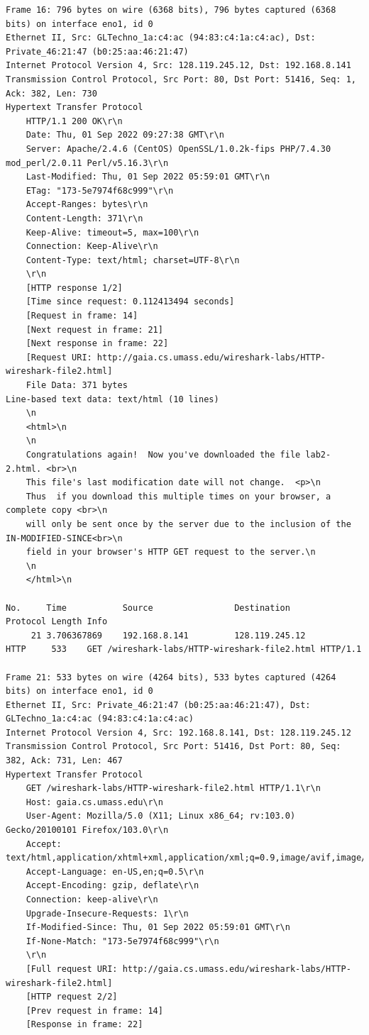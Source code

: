 \documentclass[a4paper,11pt,final]{report}
\begin{document}
\begin{lstlisting}[breaklines]
Frame 16: 796 bytes on wire (6368 bits), 796 bytes captured (6368 bits) on interface eno1, id 0
Ethernet II, Src: GLTechno_1a:c4:ac (94:83:c4:1a:c4:ac), Dst: Private_46:21:47 (b0:25:aa:46:21:47)
Internet Protocol Version 4, Src: 128.119.245.12, Dst: 192.168.8.141
Transmission Control Protocol, Src Port: 80, Dst Port: 51416, Seq: 1, Ack: 382, Len: 730
Hypertext Transfer Protocol
    HTTP/1.1 200 OK\r\n
    Date: Thu, 01 Sep 2022 09:27:38 GMT\r\n
    Server: Apache/2.4.6 (CentOS) OpenSSL/1.0.2k-fips PHP/7.4.30 mod_perl/2.0.11 Perl/v5.16.3\r\n
    Last-Modified: Thu, 01 Sep 2022 05:59:01 GMT\r\n
    ETag: "173-5e7974f68c999"\r\n
    Accept-Ranges: bytes\r\n
    Content-Length: 371\r\n
    Keep-Alive: timeout=5, max=100\r\n
    Connection: Keep-Alive\r\n
    Content-Type: text/html; charset=UTF-8\r\n
    \r\n
    [HTTP response 1/2]
    [Time since request: 0.112413494 seconds]
    [Request in frame: 14]
    [Next request in frame: 21]
    [Next response in frame: 22]
    [Request URI: http://gaia.cs.umass.edu/wireshark-labs/HTTP-wireshark-file2.html]
    File Data: 371 bytes
Line-based text data: text/html (10 lines)
    \n
    <html>\n
    \n
    Congratulations again!  Now you've downloaded the file lab2-2.html. <br>\n
    This file's last modification date will not change.  <p>\n
    Thus  if you download this multiple times on your browser, a complete copy <br>\n
    will only be sent once by the server due to the inclusion of the IN-MODIFIED-SINCE<br>\n
    field in your browser's HTTP GET request to the server.\n
    \n
    </html>\n

No.     Time           Source                Destination           Protocol Length Info
     21 3.706367869    192.168.8.141         128.119.245.12        HTTP     533    GET /wireshark-labs/HTTP-wireshark-file2.html HTTP/1.1 

Frame 21: 533 bytes on wire (4264 bits), 533 bytes captured (4264 bits) on interface eno1, id 0
Ethernet II, Src: Private_46:21:47 (b0:25:aa:46:21:47), Dst: GLTechno_1a:c4:ac (94:83:c4:1a:c4:ac)
Internet Protocol Version 4, Src: 192.168.8.141, Dst: 128.119.245.12
Transmission Control Protocol, Src Port: 51416, Dst Port: 80, Seq: 382, Ack: 731, Len: 467
Hypertext Transfer Protocol
    GET /wireshark-labs/HTTP-wireshark-file2.html HTTP/1.1\r\n
    Host: gaia.cs.umass.edu\r\n
    User-Agent: Mozilla/5.0 (X11; Linux x86_64; rv:103.0) Gecko/20100101 Firefox/103.0\r\n
    Accept: text/html,application/xhtml+xml,application/xml;q=0.9,image/avif,image/webp,*/*;q=0.8\r\n
    Accept-Language: en-US,en;q=0.5\r\n
    Accept-Encoding: gzip, deflate\r\n
    Connection: keep-alive\r\n
    Upgrade-Insecure-Requests: 1\r\n
    If-Modified-Since: Thu, 01 Sep 2022 05:59:01 GMT\r\n
    If-None-Match: "173-5e7974f68c999"\r\n
    \r\n
    [Full request URI: http://gaia.cs.umass.edu/wireshark-labs/HTTP-wireshark-file2.html]
    [HTTP request 2/2]
    [Prev request in frame: 14]
    [Response in frame: 22]


\end{lstlisting}
\end{document}
